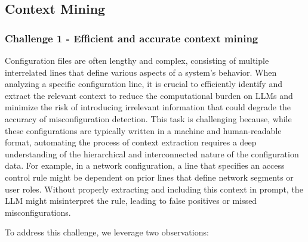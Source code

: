 \subsection{Context Mining}\label{mining_method}
\subsubsection{Challenge 1 - Efficient and accurate context mining}
\label{challenge_1}
Configuration files are often lengthy and complex, consisting of multiple interrelated lines that define various aspects of a system's behavior. When analyzing a specific configuration line, it is crucial to efficiently identify and extract the relevant context to reduce the computational burden on LLMs and minimize the risk of introducing irrelevant information that could degrade the accuracy of misconfiguration detection. This task is challenging because, while these configurations are typically written in a machine and human-readable format, automating the process of context extraction requires a deep understanding of the hierarchical and interconnected nature of the configuration data. For example, in a network configuration, a line that specifies an access control rule might be dependent on prior lines that define network segments or user roles. Without properly extracting and including this context in prompt, the LLM might misinterpret the rule, leading to false positives or missed misconfigurations.

To address this challenge, we leverage two observations:

